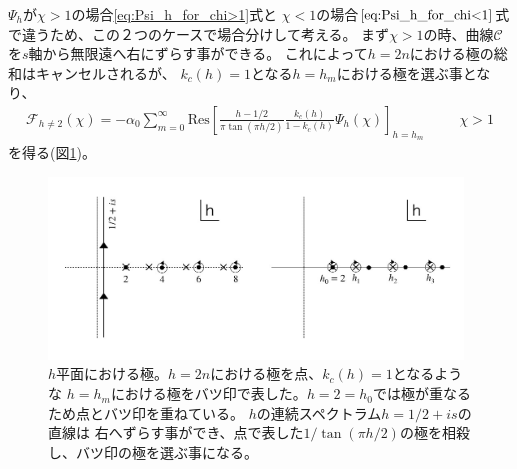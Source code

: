 $\Psi_h$が$\chi > 1$の場合\eqref{eq:Psi_h_for_chi>1}式と
$\chi < 1$の場合$\eqref{eq:Psi_h_for_chi<1}$式で違うため、この２つのケースで場合分けして考える。
まず$\chi > 1$の時、曲線$\mathcal{C}$を$s$軸から無限遠へ右にずらす事ができる。
これによって$h = 2n$における極の総和はキャンセルされるが、
$k_c(h) = 1$となる$h = h_m$における極を選ぶ事となり、
\begin{align}
	\mathcal{F}_{h\neq 2}(\chi)
	= -\alpha_0\sum_{m=0}^{\infty}\mathrm{Res}\left[
		\frac{h - 1/2}{\pi\tan(\pi h / 2)}\frac{k_c(h)}{1 - k_c(h)}\Psi_h(\chi)
	\right]_{h=h_m}
	\hspace{30pt}\chi > 1
\end{align}
を得る(図\ref{fig:poles})。
\begin{figure}[ht]
	\centering
	\includegraphics[width=11cm]{figures/poles}
	\caption{$h$平面における極。$h = 2n$における極を点、$k_c(h) = 1$となるような
	$h = h_m$における極をバツ印で表した。$h = 2 = h_0$では極が重なるため点とバツ印を重ねている。
	$h$の連続スペクトラム$h = 1/2 + is$の直線は
	右へずらす事ができ、点で表した$1/\tan(\pi h/2)$の極を相殺し、バツ印の極を選ぶ事になる。}
	\label{fig:poles}
\end{figure}

